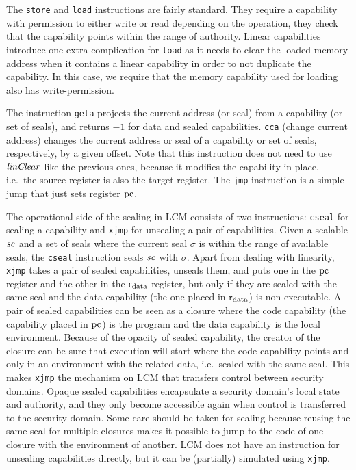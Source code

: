 \documentclass[acmsmall,screen]{acmart}\settopmatter{}
\renewcommand{\linCons}[1]{\plainfun{linClear}{#1}}
\newcommand{\trgcm}{\textsc{LCM}}
\begin{document}
The \texttt{store} and \texttt{load} instructions are fairly standard.
They require a capability with permission to either write or read depending on the operation, they check that the capability points within the range of authority.
Linear capabilities introduce one extra complication for \texttt{load} as it needs to clear the loaded memory address when it contains a linear capability in order to not duplicate the capability.
In this case, we require that the memory capability used for loading also has write-permission.

The instruction \texttt{geta} projects the current address (or seal) from a capability (or set of seals), and returns $-1$ for data and sealed capabilities.
\texttt{cca} (change current address) changes the current address or seal of a capability or set of seals, respectively, by a given offset.
Note that this instruction does not need to use $\linCons{}$ like the previous ones, because it modifies the capability in-place, i.e.\ the source register is also the target register.
The \texttt{jmp} instruction is a simple jump that just sets register $\mathrm{pc}$.

The operational side of the sealing in \trgcm{} consists of two instructions: \texttt{cseal} for sealing a capability and \texttt{xjmp} for unsealing a pair of capabilities.
Given a sealable $\mathit{sc}$ and a set of seals where the current seal $\sigma$ is within the range of available seals, the \texttt{cseal} instruction seals $\mathit{sc}$ with $\sigma$.
Apart from dealing with linearity, \texttt{xjmp} takes a pair of sealed capabilities, unseals them, and puts one in the $\mathrm{pc}$ register and the other in the $\mathrm{r}_\mathrm{data}$ register, but only if they are sealed with the same seal and the data capability (the one placed in $\mathrm{r}_\mathrm{data}$) is non-executable.
A pair of sealed capabilities can be seen as a closure where the code capability (the capability placed in $\mathrm{pc}$) is the program and the data capability is the local environment.
Because of the opacity of sealed capability, the creator of the closure can be sure that execution will start where the code capability points and only in an environment with the related data, i.e.\ sealed with the same seal.
This makes \texttt{xjmp} the mechanism on \trgcm{} that transfers control between security domains.
Opaque sealed capabilities encapsulate a security domain's local state and authority, and they only become accessible again when control is transferred to the security domain.
Some care should be taken for sealing because reusing the same seal for multiple closures makes it possible to jump to the code of one closure with the environment of another.
\trgcm{} does not have an instruction for unsealing capabilities directly, but it can be (partially) simulated using \texttt{xjmp}.
\end{document}
